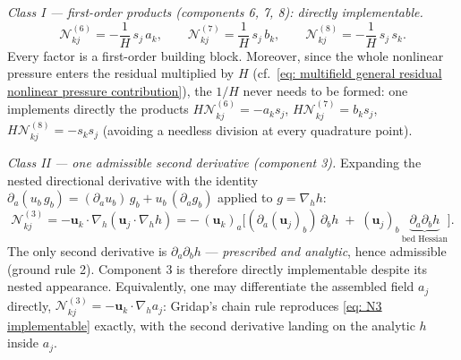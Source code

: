 \documentclass{article}
\newcommand{\uj}{\mathbf{u}_j}
\newcommand{\uk}{\mathbf{u}_k}
\newcommand{\nablah}{\nabla_h}
\begin{document}
\emph{Class I — first-order products (components 6, 7, 8): directly implementable.}
\begin{equation}
    \mathcal{N}^{(6)}_{kj} = -\frac{1}{H}\, s_j\, a_k, \qquad
    \mathcal{N}^{(7)}_{kj} = \frac{1}{H}\, s_j\, b_k, \qquad
    \mathcal{N}^{(8)}_{kj} = -\frac{1}{H}\, s_j\, s_k .
    \label{eq: N678 implementable}
\end{equation}
Every factor is a first-order building block. Moreover, since the whole nonlinear pressure enters the residual multiplied by $H$ (cf.\ \eqref{eq: multifield general residual nonlinear pressure contribution}), the $1/H$ never needs to be formed: one implements directly the products $H\mathcal{N}^{(6)}_{kj} = -a_k s_j$, $H\mathcal{N}^{(7)}_{kj} = b_k s_j$, $H\mathcal{N}^{(8)}_{kj} = -s_k s_j$ (avoiding a needless division at every quadrature point).

\emph{Class II — one admissible second derivative (component 3).} Expanding the nested directional derivative with the identity $\partial_a( u_b\, g_b) = (\partial_a u_b)\, g_b + u_b\, (\partial_a g_b)$ applied to $g = \nablah h$:
\begin{equation}
    \mathcal{N}^{(3)}_{kj} = -\uk\cdot\nablah(\uj\cdot\nablah h)
    = -\,(\uk)_a \Big[ (\partial_a (\uj)_b)\,\partial_b h \;+\; (\uj)_b\, \underbrace{\partial_a \partial_b h}_{\text{bed Hessian}} \Big].
    \label{eq: N3 implementable}
\end{equation}
The only second derivative is $\partial_a\partial_b h$ — \emph{prescribed and analytic}, hence admissible (ground rule 2). Component 3 is therefore directly implementable despite its nested appearance. Equivalently, one may differentiate the assembled field $a_j$ directly, $\mathcal{N}^{(3)}_{kj} = -\uk\cdot\nablah a_j$: Gridap's chain rule reproduces \eqref{eq: N3 implementable} exactly, with the second derivative landing on the analytic $h$ inside $a_j$.
\end{document}
